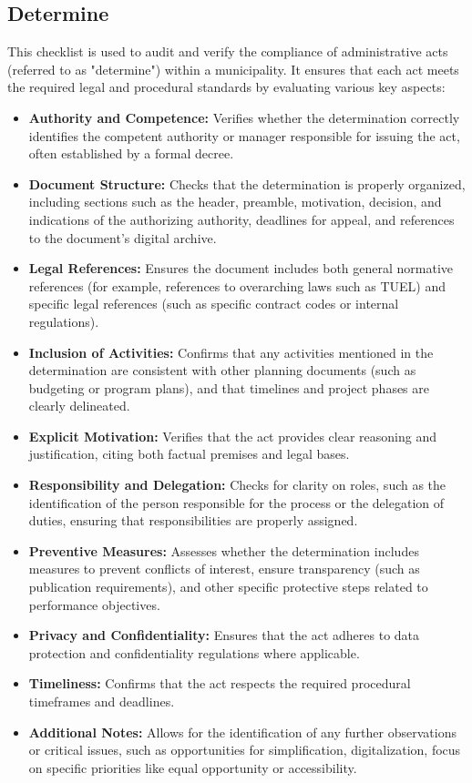 \documentclass[../main.tex]{subfiles}
\begin{document}
\subsection{Determine}
This checklist is used to audit and verify the compliance of administrative acts (referred to as "determine") within a municipality. It ensures that each act meets the required legal and procedural standards by evaluating various key aspects:

\begin{itemize}
    \item \textbf{Authority and Competence:}
 Verifies whether the determination correctly identifies the competent authority or manager responsible for issuing the act, often established by a formal decree.
    \item \textbf{Document Structure:}
 Checks that the determination is properly organized, including sections such as the header, preamble, motivation, decision, and indications of the authorizing authority, deadlines for appeal, and references to the document's digital archive.
    \item \textbf{Legal References:}
 Ensures the document includes both general normative references (for example, references to overarching laws such as TUEL) and specific legal references (such as specific contract codes or internal regulations).
    \item \textbf{Inclusion of Activities:}
 Confirms that any activities mentioned in the determination are consistent with other planning documents (such as budgeting or program plans), and that timelines and project phases are clearly delineated.
    \item \textbf{Explicit Motivation:}
 Verifies that the act provides clear reasoning and justification, citing both factual premises and legal bases.
    \item \textbf{Responsibility and Delegation:}
 Checks for clarity on roles, such as the identification of the person responsible for the process or the delegation of duties, ensuring that responsibilities are properly assigned.
    \item \textbf{Preventive Measures:}
 Assesses whether the determination includes measures to prevent conflicts of interest, ensure transparency (such as publication requirements), and other specific protective steps related to performance objectives.
    \item \textbf{Privacy and Confidentiality:}
 Ensures that the act adheres to data protection and confidentiality regulations where applicable.
    \item \textbf{Timeliness:}
 Confirms that the act respects the required procedural timeframes and deadlines.
    \item \textbf{Additional Notes:}
 Allows for the identification of any further observations or critical issues, such as opportunities for simplification, digitalization, focus on specific priorities like equal opportunity or accessibility.
\end{itemize}

\end{document}
